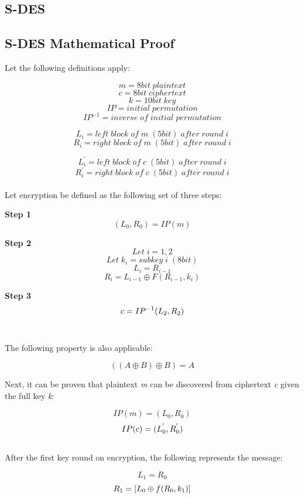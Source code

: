 \documentclass[]{article}
\begin{document}
\vspace*{-0.8cm}
\begin{center}
	\section*{S-DES}
\end{center}

\vspace*{0.8cm}
\subsection*{S-DES Mathematical Proof}

Let the following definitions apply:

$$m = 8bit\;plaintext$$
$$c = 8bit\;ciphertext$$
$$k = 10bit\;key$$
$$IP = initial\;permutation$$
$$IP^{-1} = inverse\;of\;initial\;permutation$$

$$L_i = left\;block\;of\;m\;(5bit)\;after\;round\;i$$
$$R_i = right\;block\;of\;m\;(5bit)\;after\;round\;i$$

$$L^{'}_i = left\;block\;of\;c\;(5bit)\;after\;round\;i$$
$$R^{'}_i = right\;block\;of\;c\;(5bit)\;after\;round\;i$$\\

Let encryption be defined as the following set of three steps:\\

\begin{center}
\textbf{Step 1}
$$(L_0,R_0)=IP(m)$$

\textbf{Step 2}
$$Let\;i=1,2$$
$$Let\;k_i=subkey\;i\;(8bit)$$
$$L_i=R_{i-1}$$
$$R_i=L_{i-1}\oplus F(R_{i-1},k_i)$$

\textbf{Step 3}
$$c=IP^{-1}(L_{2},R_{2})\\$$\\
\end{center}

The following property is also applicable:

$$((A\oplus B) \oplus B) = A$$

\newpage
\noindent
Next, it can be proven that plaintext \textit{m} can be discovered from ciphertext \textit{c} given the full key \textit{k}:

$$IP(m)=(L_0,R_0)$$
$$IP(c)=(L^{'}_0,R^{'}_0)\\$$\\

\noindent After the first key round on encryption, the following represents the message:

$$L_1=R_0$$
$$R_1=[L_0\oplus f(R_0,k_1)]\\$$\\
\end{document}
